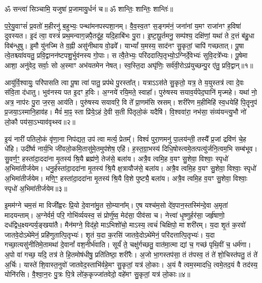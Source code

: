 \setcounter{anuvakam}{0}
ॐ सन्त्वा॑ सिञ्चामि॒ यजुषा॑ प्र॒जामायु॒र्धनं॑ च॥ ॐ शान्तिः॒ शान्तिः॒ शान्तिः॑॥

प॒रे॒यु॒वाꣳसं॑ प्र॒वतो॑ म॒हीरनु॑ ब॒हुभ्यः॒ पन्था॑मनपस्पशा॒नम्। 
वै॒व॒स्व॒तꣳ स॒ङ्गम॑नं॒ जना॑नां य॒मꣳ राजा॑नꣳ ह॒विषा॑ दुवस्यत। 
इ॒दं त्वा॒ वस्त्रं॑ प्रथ॒मन्वाग॒न्नपै॒तदू॑ह॒ यदि॒हाबि॑भः पु॒रा। 
इ॒ष्टा॒पू॒र्तमनु॒ सम्प॑श्य॒ दक्षि॑णां॒ यथा॑ ते द॒त्तं ब॑हु॒धा विब॑न्धुषु। 
इ॒मौ यु॑नज्मि ते व॒ह्नी असु॑नीथाय वो॒ढवे᳚। 
याभ्यां᳚ य॒मस्य॒ साद॑नꣳ सु॒कृतां॒ चापि॑ गच्छतात्। 
पू॒षा त्वे॒तश्च्या॑वयतु॒ प्रवि॒द्वानन॑ष्टपशु॒र्भुव॑नस्य गो॒पाः। 
स त्वै॒तेभ्यः॒ परि॑ददात्पि॒तृभ्यो॒ऽग्निर्दे॒वेभ्यः॑ सुवि॒दत्रे᳚भ्यः। 
पू॒षेमा आशा॒ अनु॑वेद॒ सर्वाः॒ सो अ॒स्माꣳ अभ॑यतमेन नेषत्। 
स्व॒स्ति॒दा अघृ॑णिः॒ सर्व॑वी॒रोऽप्र॑युच्छन्पु॒र ए॑तु॒ प्रवि॒द्वान्॥१॥

आयु॑र्वि॒श्वायुः॒ परि॑पासति त्वा पू॒षा त्वा॑ पातु॒ प्रप॑थे पु॒रस्ता᳚त्। 
यत्राऽऽस॑ते सु॒कृतो॒ यत्र॒ ते य॒युस्तत्र॑ त्वा दे॒वः स॑वि॒ता द॑धातु। 
भुव॑नस्य पत इ॒दꣳ ह॒विः। 
अ॒ग्नये॑ रयि॒मते॒ स्वाहा᳚। 
पुरु॑षस्य सयाव॒र्यपेद॒घानि॑ मृज्महे। 
यथा॑ नो॒ अत्र॒ नाप॑रः पु॒रा ज॒रस॒ आय॑ति। 
पुरु॑षस्य सयावरि॒ वि ते᳚ प्रा॒णम॑सि स्रसम्। 
शरी॑रेण म॒हीमिहि॑ स्व॒धयेहि॑ पि॒तॄनुप॑ प्र॒जया॒ऽस्मानि॒हाव॑ह। 
मैवं॑ मा॒ꣴ॒ स्ता प्रि॑ये॒ऽहं दे॒वी स॒ती पि॑तृलो॒कं यदैषि॑। 
वि॒श्ववा॑रा॒ नभ॑सा॒ संव्य॑यन्त्यु॒भौ नो॑ लो॒कौ पय॑सा॒ऽभ्याव॑वृथ्स्व॥२॥

इ॒यं नारी॑ पतिलो॒कं वृ॑णा॒ना निप॑द्यत॒ उप॑ त्वा मर्त्य॒ प्रेतम्᳚। 
विश्वं॑ पुरा॒णमनु॑ पा॒लय॑न्ती॒ तस्यै᳚ प्र॒जां द्रवि॑णं चे॒ह धे॑हि। 
उदी᳚र्ष्व नार्य॒भि जी॑वलो॒कमि॒तासु॑मे॒तमुप॑शेष॒ एहि॑। 
ह॒स्त॒ग्रा॒भस्य॑ दिधि॒षोस्त्वमे॒तत्पत्यु॑र्जनि॒त्वम॒भि सम्ब॑भूव। 
सु॒वर्ण॒ꣳ॒ हस्ता॑दा॒ददा॑ना मृ॒तस्य॑ श्रि॒यै ब्रह्म॑णे॒ तेज॑से॒ बला॑य। 
अत्रै॒व त्वमि॒ह व॒यꣳ सु॒शेवा॒ विश्वाः॒ स्पृधो॑ अ॒भिमा॑तीर्जयेम। 
धनु॒र्\mbox{}हस्ता॑दा॒ददा॑ना मृ॒तस्य॑ श्रि॒यै क्ष॒त्रायौज॑से॒ बला॑य। 
अत्रै॒व त्वमि॒ह व॒यꣳ सु॒शेवा॒ विश्वाः॒ स्पृधो॑ अ॒भिमा॑तीर्जयेम। 
मणि॒ꣳ॒ हस्ता॑दा॒ददा॑ना मृ॒तस्य॑ श्रि॒यै वि॒शे पुष्ट्यै॒ बला॑य। 
अत्रै॒व त्वमि॒ह व॒यꣳ सु॒शेवा॒ विश्वाः॒ स्पृधो॑ अ॒भिमा॑तीर्जयेम॥३॥

इ॒मम॑ग्ने चम॒सं मा विजी᳚ह्वरः प्रि॒यो दे॒वाना॑मु॒त सो॒म्याना᳚म्। 
ए॒ष यश्च॑म॒सो दे॑व॒पान॒स्तस्मि॑न्दे॒वा अ॒मृता॑ मादयन्ताम्। 
अ॒ग्नेर्वर्म॒ परि॒ गोभि॑र्व्ययस्व॒ सं प्रोर्णु॑ष्व॒ मेद॑सा॒ पीव॑सा च। 
नेत्त्वा॑ धृ॒ष्णुर्\mbox{}हर॑सा॒ जर्\mbox{}हृ॑षाणो॒ दध॑द्विध॒क्ष्यन्पर्य॒ङ्खया॑तै। 
मैन॑मग्ने॒ विद॑हो॒ माऽभिशो॑चो॒ माऽस्य॒ त्वचं॑ चिक्षिपो॒ मा शरी॑रम्। 
य॒दा शृ॒तं क॒रवो॑ जातवे॒दोऽथे॑मेनं॒ प्रहि॑णुतात्पि॒तृभ्यः॑। 
शृ॒तं य॒दा क॒रसि॑ जातवे॒दोऽथे॑मेनं॒ परि॑दत्तात्पि॒तृभ्यः॑। 
य॒दा गच्छा॒त्यसु॑नीतिमे॒तामथा॑ दे॒वानां᳚ वश॒नीर्भ॑वाति। 
सूर्यं॑ ते॒ चक्षु॑र्गच्छतु॒ वात॑मा॒त्मा द्यां च॒ गच्छ॑ पृथि॒वीं च॒ धर्म॑णा। 
अ॒पो वा॑ गच्छ॒ यदि॒ तत्र॑ ते हि॒तमोष॑धीषु॒ प्रति॑तिष्ठा॒ शरी॑रैः। 
अ॒जो भा॒गस्तप॑सा॒ तं त॑पस्व॒ तं ते॑ शो॒चिस्त॑पतु॒ तं ते॑ अ॒र्चिः। 
यास्ते॑ शि॒वास्त॒नुवो॑ जातवेद॒स्ताभि॑र्वहे॒मꣳ सु॒कृतां॒ यत्र॑ लो॒काः। 
अ॒यं वै त्वम॒स्मादधि॒ त्वमे॒तद॒यं वै तद॑स्य॒ योनि॑रसि। 
वै॒श्वा॒न॒रः पु॒त्रः पि॒त्रे लो॑क॒कृज्जा॑तवेदो॒ वहे॑मꣳ सु॒कृतां॒ यत्र॑ लो॒काः॥४॥
\anuvakamend[वि॒द्वान॒भ्याव॑वृथ्स्वा॒भिमा॑तीर्जयेम॒ शरी॑रैश्च॒त्वारि॑ च]

